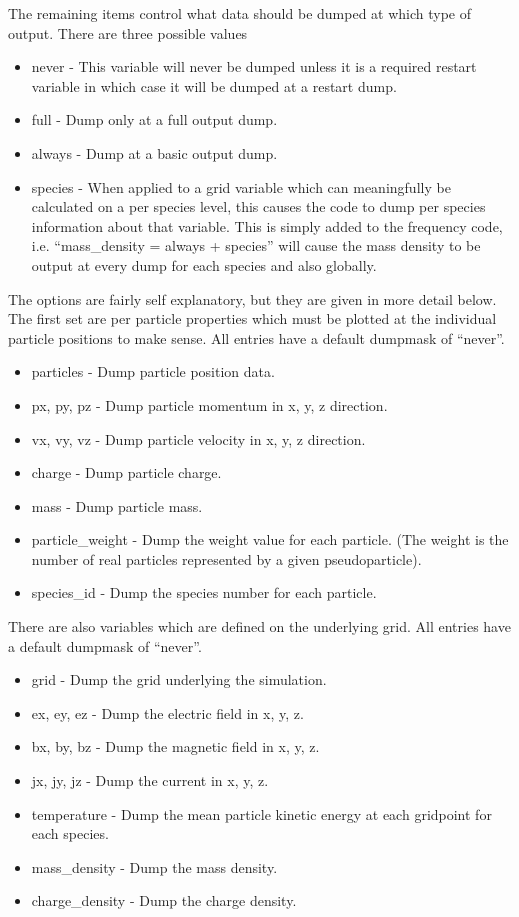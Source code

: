 The remaining items control what data should be dumped at which type of
output. There are three possible values\\
\begin{itemize}
\item never - This variable will never be dumped unless it is a required restart
  variable in which case it will be dumped at a restart dump.
\item full - Dump only at a full output dump.
\item always - Dump at a basic output dump.
\item species - When applied to a grid variable which can meaningfully be
  calculated on a per species level, this causes the code to dump per species
  information about that variable. This is simply added to the frequency code,
  i.e. ``mass\_density = always + species'' will cause the mass density to be
  output at every dump for each species and also globally.
\end{itemize}

The options are fairly self explanatory, but they are given in more detail
below. The first set are per particle properties which must be plotted at the
individual particle positions to make sense. All entries have a default
dumpmask of ``never''.\\
\begin{itemize}
\item particles - Dump particle position data.
\item px, py, pz - Dump particle momentum in x, y, z direction.
\item vx, vy, vz - Dump particle velocity in x, y, z direction.
\item charge - Dump particle charge.
\item mass - Dump particle mass.
\item particle\_weight - Dump the weight value for each particle. (The weight
  is the number of real particles represented by a given pseudoparticle).
\item species\_id - Dump the species number for each particle.
\end{itemize}

There are also variables which are defined on the underlying grid. All entries
have a default dumpmask of ``never''.\\
\begin{itemize}
\item grid - Dump the grid underlying the simulation.
\item ex, ey, ez - Dump the electric field in x, y, z.
\item bx, by, bz - Dump the magnetic field in x, y, z.
\item jx, jy, jz - Dump the current in x, y, z.
\item temperature - Dump the mean particle kinetic energy at each gridpoint
  for each species.
\item mass\_density - Dump the mass density.
\item charge\_density - Dump the charge density.
\end{itemize}

